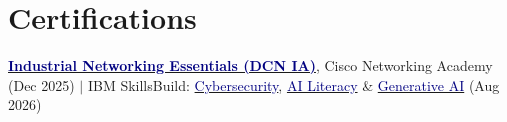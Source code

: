 \documentclass[letterpaper,11pt]{article}
\begin{document}
\section{Certifications}
 \begin{itemize}[leftmargin=0.15in, label={}]
    \small{\item{
     \href{https://www.credly.com/badges/02ea5141-2c96-4ac7-87d1-0dd887a0e5fd}{\textcolor{navy}{\textbf{Industrial Networking Essentials (DCN IA)}}}, Cisco Networking Academy (Dec 2025) \; $\vert$ \;
     IBM SkillsBuild: \href{https://www.credly.com/badges/051ac5d9-abba-419b-a3a0-36f297f794f7}{\textcolor{navy}{Cybersecurity}}, \href{https://www.credly.com/go/MpqdCdmm}{\textcolor{navy}{AI Literacy}} \& \href{https://www.credly.com/badges/7ac05f19-33ca-403c-93d2-ade7ba921c32/public_url}{\textcolor{navy}{Generative AI}} (Aug 2026)
    }}
 \end{itemize}
\end{document}
